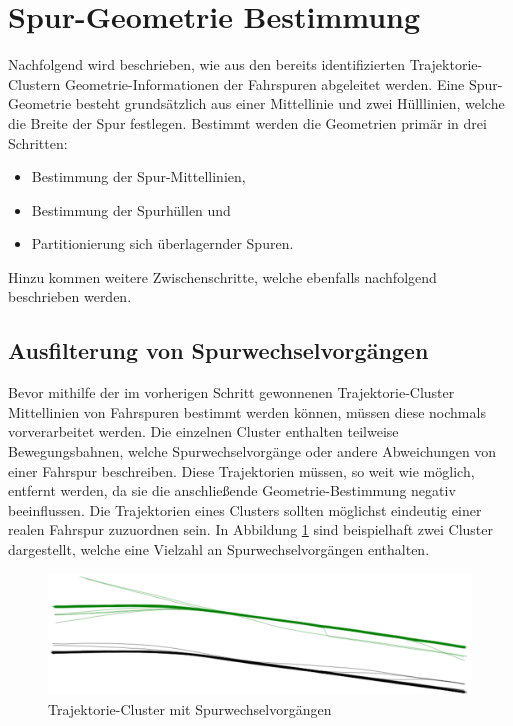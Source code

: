 
\section{Spur-Geometrie Bestimmung}
\label{cha:lane_definition}

Nachfolgend wird beschrieben, wie aus den bereits identifizierten Trajektorie-Clustern
Geometrie-Informationen der Fahrspuren abgeleitet werden. Eine Spur-Geometrie besteht grundsätzlich
aus einer Mittellinie und zwei Hülllinien, welche die Breite der Spur festlegen.
Bestimmt werden die Geometrien primär in drei Schritten:

\begin{itemize}
    \item Bestimmung der Spur-Mittellinien,
    \item Bestimmung der Spurhüllen und
    \item Partitionierung sich überlagernder Spuren.
\end{itemize}

Hinzu kommen weitere Zwischenschritte, welche ebenfalls nachfolgend beschrieben werden.

\subsection{Ausfilterung von Spurwechselvorgängen}
\label{sec:real2_filter_lane_change}

Bevor mithilfe der im vorherigen Schritt gewonnenen Trajektorie-Cluster Mittellinien von Fahrspuren bestimmt
werden können, müssen diese nochmals vorverarbeitet werden. Die einzelnen Cluster enthalten teilweise
Bewegungsbahnen, welche Spurwechselvorgänge oder andere Abweichungen von einer Fahrspur beschreiben.
Diese Trajektorien müssen, so weit wie möglich,
entfernt werden, da sie die anschließende Geometrie-Bestimmung negativ beeinflussen. Die Trajektorien
eines Clusters sollten möglichst eindeutig einer realen Fahrspur zuzuordnen sein. In Abbildung
\ref{fig:real2_clusters_pre_postpro} sind beispielhaft zwei Cluster dargestellt, welche eine Vielzahl an
Spurwechselvorgängen enthalten.

\begin{figure}[H]
    \centering
    \includegraphics[width=0.8\linewidth]{resources/img/umsetzung/U2/Clusters_Pre_Postprocessing}
    \caption{Trajektorie-Cluster mit Spurwechselvorgängen}
    \label{fig:real2_clusters_pre_postpro}
\end{figure}

